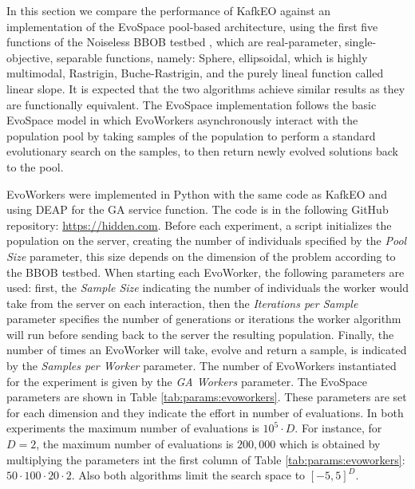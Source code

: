 \documentclass{llncs}
\begin{document}
  In this section we compare the performance of KafkEO against an implementation of
  the EvoSpace \cite{García-Valdez2015} pool-based architecture, using the first five
  functions of the Noiseless BBOB testbed \cite{hansen2016coco}, 
  which are real-parameter, single-objective, separable functions,
  namely: Sphere,  ellipsoidal, which is highly multimodal,
  Rastrigin,  Buche-Rastrigin,  and the purely lineal function called
  linear  slope. It is expected that the two algorithms achieve
  similar results as 
  they are functionally equivalent. The EvoSpace implementation follows the
  basic EvoSpace model in which EvoWorkers asynchronously interact with the
  population pool by taking samples of the population to perform a standard
  evolutionary search on the samples, to then return newly evolved solutions back
  to the pool.

  EvoWorkers were implemented in Python with the same code as KafkEO and using
  DEAP \cite{fortin2012deap} for the GA service function. The code is in the
  following GitHub repository: \url{https://hidden.com}. Before each
  experiment, a script initializes the population on the server, creating the
  number of individuals specified by the {\em Pool Size} parameter, this
  size depends on the dimension of the problem according to the BBOB testbed.
  When starting each EvoWorker, the following parameters are used: first, the
  {\em Sample Size} indicating the number of individuals the worker would take
  from the server on each interaction, then the {\em Iterations per Sample}
  parameter specifies the number of generations or iterations the worker algorithm
  will run before sending back to the server the resulting population. Finally,
  the number of times an  EvoWorker will take, evolve and return a sample, is
  indicated by the {\em Samples per Worker} parameter.
   The number of EvoWorkers instantiated for the experiment 
   is given by the {\em GA Workers} parameter.  The EvoSpace parameters
  are shown in Table \ref{tab:params:evoworkers}.
   These parameters are set for
  each dimension and they indicate the effort in number of evaluations. In both
   experiments the maximum number of evaluations is $10^5 \cdot D$. For instance,
   for $D = 2$, the maximum number of evaluations is $200,000$ which is 
   obtained by multiplying
    the parameters int the first column of Table \ref{tab:params:evoworkers}: $50 \cdot 100 \cdot 20 \cdot 2$. Also both algorithms limit the search space to $[-5,5]^D$.
\end{document}
